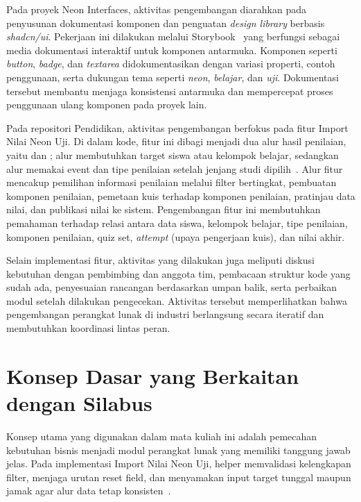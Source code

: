 Pada proyek Neon Interfaces, aktivitas pengembangan diarahkan pada penyusunan dokumentasi komponen dan penguatan \textit{design library} berbasis \textit{shadcn/ui}. Pekerjaan ini dilakukan melalui Storybook~\cite{storybook_docs,shadcn_ui} yang berfungsi sebagai media dokumentasi interaktif untuk komponen antarmuka. Komponen seperti \textit{button}, \textit{badge}, dan \textit{textarea} didokumentasikan dengan variasi properti, contoh penggunaan, serta dukungan tema seperti \textit{neon}, \textit{belajar}, dan \textit{uji}. Dokumentasi tersebut membantu menjaga konsistensi antarmuka dan mempercepat proses penggunaan ulang komponen pada proyek lain.

Pada repositori Pendidikan, aktivitas pengembangan berfokus pada fitur Import Nilai Neon Uji. Di dalam kode, fitur ini dibagi menjadi dua alur hasil penilaian, yaitu  dan ; alur  membutuhkan target siswa atau kelompok belajar, sedangkan alur  memakai event dan tipe penilaian setelah jenjang studi dipilih~\cite{pendidikan_useImportNeonUji_composable,pendidikan_useImportNeonUji_helpers}. Alur fitur mencakup pemilihan informasi penilaian melalui filter bertingkat, pembuatan komponen penilaian, pemetaan kuis terhadap komponen penilaian, pratinjau data nilai, dan publikasi nilai ke sistem. Pengembangan fitur ini membutuhkan pemahaman terhadap relasi antara data siswa, kelompok belajar, tipe penilaian, komponen penilaian, quiz set, \textit{attempt} (upaya pengerjaan kuis), dan nilai akhir.

Selain implementasi fitur, aktivitas yang dilakukan juga meliputi diskusi kebutuhan dengan pembimbing dan anggota tim, pembacaan struktur kode yang sudah ada, penyesuaian rancangan berdasarkan umpan balik, serta perbaikan modul setelah dilakukan pengecekan. Aktivitas tersebut memperlihatkan bahwa pengembangan perangkat lunak di industri berlangsung secara iteratif dan membutuhkan koordinasi lintas peran.

\section{Konsep Dasar yang Berkaitan dengan Silabus}
Konsep utama yang digunakan dalam mata kuliah ini adalah pemecahan kebutuhan bisnis menjadi modul perangkat lunak yang memiliki tanggung jawab jelas. Pada implementasi Import Nilai Neon Uji, helper  memvalidasi kelengkapan filter,  menjaga urutan reset field, dan  menyamakan input target tunggal maupun jamak agar alur data tetap konsisten~\cite{pendidikan_useImportNeonUji_helpers,pendidikan_useImportNeonUji_test}.

